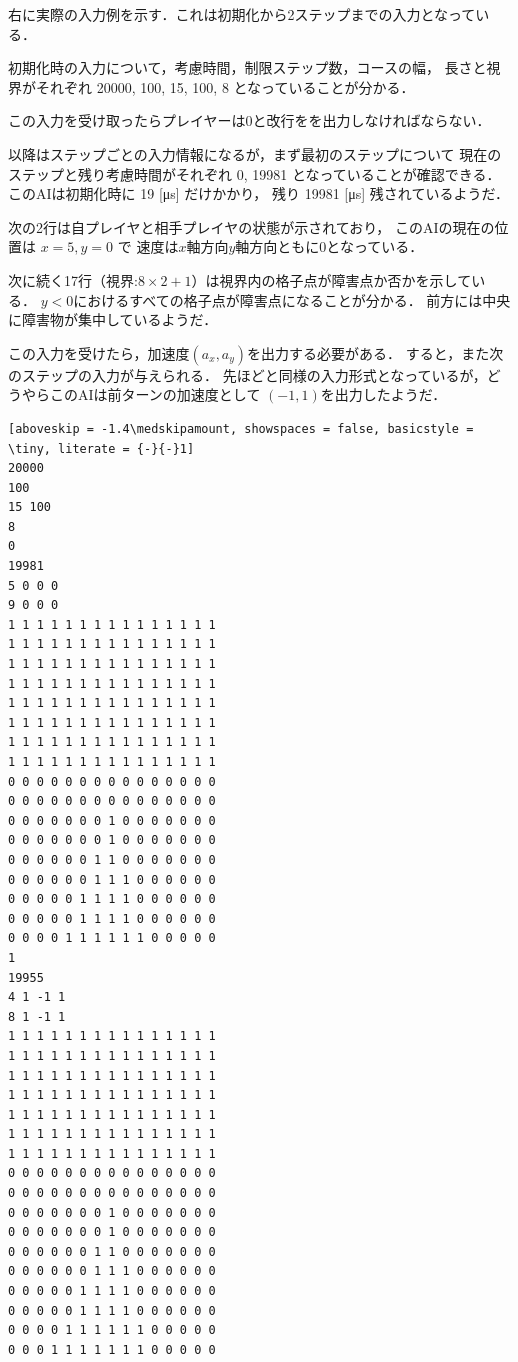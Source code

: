 \documentclass[11pt]{jarticle}
\begin{document}
\begin{minipage}[t]{.6\textwidth}

右に実際の入力例を示す．これは初期化から2ステップまでの入力となっている．

初期化時の入力について，考慮時間，制限ステップ数，コースの幅，
長さと視界がそれぞれ 20000, 100, 15, 100, 8
となっていることが分かる．

この入力を受け取ったらプレイヤーは0と改行をを出力しなければならない．

以降はステップごとの入力情報になるが，まず最初のステップについて
現在のステップと残り考慮時間がそれぞれ 0, 19981
となっていることが確認できる．このAIは初期化時に 19 [\si{\micro \second}] だけかかり，
残り 19981 [\si{\micro \second}] 残されているようだ．

次の2行は自プレイヤと相手プレイヤの状態が示されており，
このAIの現在の位置は $x = 5, y = 0$ で
速度は$x$軸方向$y$軸方向ともに0となっている．

次に続く17行（$\text{視界:}8 \times 2 + 1$）は視界内の格子点が障害点か否かを示している．
$y < 0$におけるすべての格子点が障害点になることが分かる．
前方には中央に障害物が集中しているようだ．

この入力を受けたら，加速度$(a_x, a_y)$を出力する必要がある．
すると，また次のステップの入力が与えられる．
先ほどと同様の入力形式となっているが，どうやらこのAIは前ターンの加速度として
$(-1, 1)$を出力したようだ．

\end{minipage}
\hfill
\begin{minipage}[t]{.3\textwidth}
\begin{lstlisting}[aboveskip = -1.4\medskipamount, showspaces = false, basicstyle = \tiny, literate = {-}{-}1]
20000
100
15 100
8
0
19981
5 0 0 0
9 0 0 0
1 1 1 1 1 1 1 1 1 1 1 1 1 1 1
1 1 1 1 1 1 1 1 1 1 1 1 1 1 1
1 1 1 1 1 1 1 1 1 1 1 1 1 1 1
1 1 1 1 1 1 1 1 1 1 1 1 1 1 1
1 1 1 1 1 1 1 1 1 1 1 1 1 1 1
1 1 1 1 1 1 1 1 1 1 1 1 1 1 1
1 1 1 1 1 1 1 1 1 1 1 1 1 1 1
1 1 1 1 1 1 1 1 1 1 1 1 1 1 1
0 0 0 0 0 0 0 0 0 0 0 0 0 0 0
0 0 0 0 0 0 0 0 0 0 0 0 0 0 0
0 0 0 0 0 0 0 1 0 0 0 0 0 0 0
0 0 0 0 0 0 0 1 0 0 0 0 0 0 0
0 0 0 0 0 0 1 1 0 0 0 0 0 0 0
0 0 0 0 0 0 1 1 1 0 0 0 0 0 0
0 0 0 0 0 1 1 1 1 0 0 0 0 0 0
0 0 0 0 0 1 1 1 1 0 0 0 0 0 0
0 0 0 0 1 1 1 1 1 1 0 0 0 0 0
1
19955
4 1 -1 1
8 1 -1 1
1 1 1 1 1 1 1 1 1 1 1 1 1 1 1
1 1 1 1 1 1 1 1 1 1 1 1 1 1 1
1 1 1 1 1 1 1 1 1 1 1 1 1 1 1
1 1 1 1 1 1 1 1 1 1 1 1 1 1 1
1 1 1 1 1 1 1 1 1 1 1 1 1 1 1
1 1 1 1 1 1 1 1 1 1 1 1 1 1 1
1 1 1 1 1 1 1 1 1 1 1 1 1 1 1
0 0 0 0 0 0 0 0 0 0 0 0 0 0 0
0 0 0 0 0 0 0 0 0 0 0 0 0 0 0
0 0 0 0 0 0 0 1 0 0 0 0 0 0 0
0 0 0 0 0 0 0 1 0 0 0 0 0 0 0
0 0 0 0 0 0 1 1 0 0 0 0 0 0 0
0 0 0 0 0 0 1 1 1 0 0 0 0 0 0
0 0 0 0 0 1 1 1 1 0 0 0 0 0 0
0 0 0 0 0 1 1 1 1 0 0 0 0 0 0
0 0 0 0 1 1 1 1 1 1 0 0 0 0 0
0 0 0 1 1 1 1 1 1 1 0 0 0 0 0
\end{lstlisting}
\end{minipage}
\end{document}

